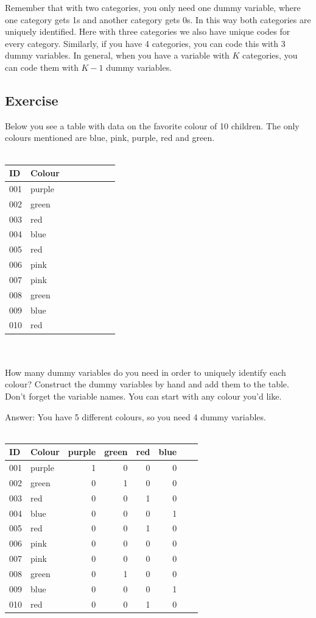 \documentclass[]{report}\usepackage[]{graphicx}\usepackage[]{color}
\begin{document}
Remember that with two categories, you only need one dummy variable, where one category gets 1s and another category gets 0s. In this way both categories are uniquely identified. Here with three categories we also have unique codes for every category. Similarly, if you have 4 categories, you can code this with 3 dummy variables. In general, when you have a variable with $K$ categories, you can code them with $K-1$ dummy variables.


\subsection{Exercise}

Below you see a table with data on the favorite colour of 10 children. The only colours mentioned are blue, pink, purple, red and green. 
\\
 \\
 \begin{tabular}{llrrrrrr}
 ID & Colour &   &&&&&\\ \hline
  001 &purple & &&&&&\\
  002 &green &  &&&&&\\
  003 &red &  &&&&&\\
  004 &blue &  &&&&&\\
  005 &red &  &&&&&\\
  006 &pink &  &&&&&\\
  007 &pink &  &&&&&\\
  008 &green &  &&&&&\\
  009 &blue &  &&&&&\\
  010 &red &  &&&&&\\
 \end{tabular}
\\
\\
How many dummy variables do you need in order to uniquely identify each colour? Construct the dummy variables by hand and add them to the table. Don't forget the variable names. You can start with any colour you'd like.


Answer:
You have 5 different colours, so you need 4 dummy variables.
\\
 \\
 \begin{tabular}{llrrrrrr}
 ID & Colour &  purple &green&red&blue&&\\ \hline
  001 &purple & 1&0&0&0&\\
  002 &green &  0&1&0&0&\\
  003 &red & 0&0&1&0&\\
  004 &blue &  0&0&0&1&\\
  005 &red & 0&0&1&0&\\
  006 &pink &  0&0&0&0&\\
  007 &pink &  0&0&0&0&\\
  008 &green &  0&1&0&0&\\
  009 &blue &  0&0&0&1&\\
  010 &red &  0&0&1&0&\\
 \end{tabular}
\\
\\
\end{document}
